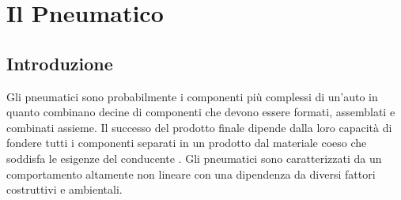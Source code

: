 \chapter{Il Pneumatico}
\label{Pneumatico}
%
\section{Introduzione}
Gli pneumatici sono probabilmente i componenti più complessi di un'auto in quanto combinano decine di componenti che devono essere formati, assemblati e combinati assieme. Il successo del prodotto finale dipende dalla loro capacità di fondere tutti i componenti separati in un prodotto dal materiale coeso che soddisfa le esigenze del conducente \cite{rill}. Gli pneumatici sono caratterizzati da un comportamento altamente non lineare con una dipendenza da diversi fattori costruttivi e ambientali.
%
